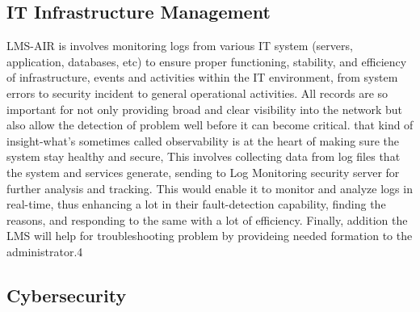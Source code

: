 



\subsection{IT Infrastructure Management}
LMS-AIR is  involves monitoring logs from various IT system (servers, application, databases, etc) to ensure proper functioning, stability, and efficiency of infrastructure, events and activities within the IT environment, from system errors to security incident to general operational activities. All records are so important for not only providing broad and clear visibility into the network but also allow the detection of problem well before it can become critical. that kind of insight-what's sometimes called observability is at the heart of making sure the system stay healthy and secure, This involves collecting data from log files that the system and services generate, sending to Log Monitoring security server for further analysis and tracking. This would enable it to monitor and analyze logs in real-time, thus enhancing a lot in their fault-detection capability, finding the reasons, and responding to the same with a lot of efficiency. Finally, addition the LMS will help for troubleshooting problem by provideing needed formation to the administrator\cite{6956774, 7300604}.4




\subsection{Cybersecurity}

